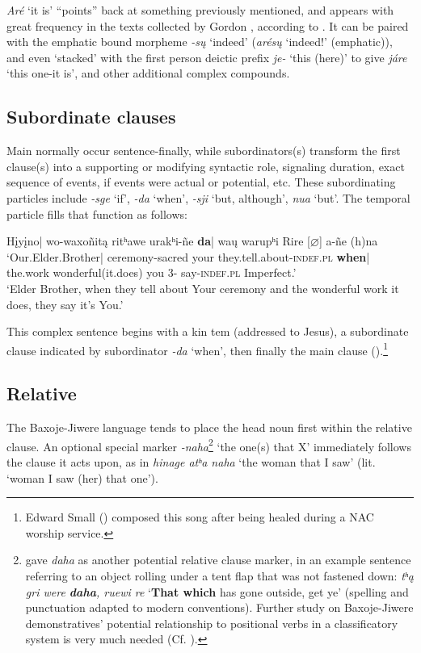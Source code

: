 \documentclass[output=paper]{LSP/langsci}
\begin{document}
\textit{Aré} `it is' ``points'' back at something previously mentioned, and appears with great frequency in the texts collected by Gordon \citet{Marsh1936}, according to \citet{HopkinsFurbee1989}. It can be paired with the emphatic bound morpheme \textit{-s\k{u}} `indeed' (\textit{arés\k{u}} `indeed!' (emphatic)), and even `stacked' with the first person deictic prefix \textit{je-} `this (here)' to give \textit{járe} `this one-it is', and other additional complex compounds.    

\subsection{Subordinate clauses}
Main  normally occur sentence-finally, while subordinators(s) transform the first clause(s) into a supporting or modifying syntactic role, signaling duration, exact sequence of events, if events were actual or potential, etc. These subordinating particles include \textit{-sge} `if', \textit{-da} `when',  \textit{-sji}  `but, although', \textit{nua} `but'.   The temporal particle fills that function as follows:

\ea \gll  H\k{i}y\k{i}no| wo-waxoñit\k{a}   ritʰawe  urakʰi-ñe   \textbf{da}| wa\k{u}       warupʰi  Rire  [$\varnothing$] a-ñe  (h)na \\ 
`Our.Elder.Brother| 	ceremony-sacred  your  they.tell.about-\textsc{indef.pl}   \textbf{when}| the.work wonderful(it.does)	  you  3- say-\textsc{indef.pl}         Imperfect.' \\
\trans `Elder Brother, when they tell about Your ceremony and the wonderful work it does, they say it's You.'
\z		

This complex sentence begins with a kin tem (addressed to Jesus), a subordinate clause indicated by subordinator \textit{-da} `when', then finally the main clause (\citealt[Song \#16]{Davidson1997}).\footnote{Edward Small () composed this song after being healed during a NAC worship service.}  		

\subsection{Relative }  
The Baxoje-Jiwere language tends to place the head noun first within the relative clause.  An optional special marker \textit{-naha}\footnote{\citet{DorseyNDChiwere} gave \textit{daha} as another potential relative clause marker, in an example sentence referring to an object rolling under a tent flap that was not fastened down: \textit{tʰ\k{a} gri were \textbf{daha}, ruewi re} `\textbf{That which} has gone outside, get ye' (spelling and punctuation adapted to modern conventions). Further study on Baxoje-Jiwere demonstratives' potential relationship to positional verbs in a classificatory system is very much needed (Cf. \citealt[3]{Rankin2005b}).}  `the one(s) that X' immediately follows the clause it acts upon, as in \textit{hinage atʰa naha} `the woman that I saw' (lit. `woman I saw (her) that one').   
\end{document}
